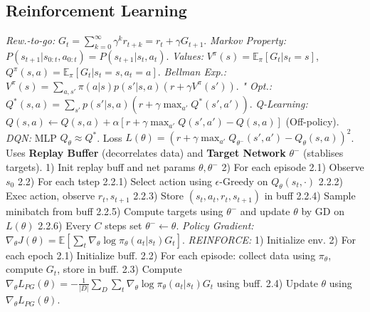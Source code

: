 \subsection{Reinforcement Learning}
\emph{Rew.-to-go:} $G_t =\sum_{k=0}^\infty \gamma^k r_{t+k} = r_t + \gamma G_{t+1}$.
\emph{Markov Property:} $P(s_{t+1}|s_{0:t}, a_{0:t}) = P(s_{t+1}|s_t, a_t)$.
\emph{Values:} $V^\pi(s) = \mathbb{E}_\pi[G_t | s_t = s]$, $Q^\pi(s, a) = \mathbb{E}_\pi[G_t | s_t = s, a_t = a]$.
\emph{Bellman Exp.:} $V^\pi(s) = \sum_{a,s'} \pi(a|s) p(s'|s, a) (r + \gamma V^\pi(s'))$.
\emph{" Opt.:} $Q^*(s, a) = \sum_{s'} p(s'|s, a) (r + \gamma \max_{a'} Q^*(s', a'))$.
\emph{Q-Learning:} $Q(s, a) \leftarrow Q(s, a) + \alpha [r + \gamma \max_{a'} Q(s', a') - Q(s, a)]$ (Off-policy). 
\emph{DQN:} MLP $Q_\theta \approx Q^*$. Loss $L(\theta) = (r + \gamma \max_{a'} Q_{\theta^-}(s', a') - Q_\theta(s, a))^2$. Uses \textbf{Replay Buffer} (decorrelates data) and \textbf{Target Network} $\theta^-$ (stablises targets). 1) Init replay buff and net params $\theta, \theta^-$ 2) For each episode 2.1) Observe $s_0$  2.2) For each tstep 2.2.1) Select action using $\epsilon$-Greedy on $Q_\theta(s_t, \cdot)$ 2.2.2) Exec action, observe $r_t,s_{t+1}$ 2.2.3) Store $(s_t, a_t, r_t, s_{t+1})$ in buff 2.2.4) Sample minibatch from buff 2.2.5) Compute targets using $\theta^-$ and update $\theta$ by GD on $L(\theta)$ 2.2.6) Every $C$ steps set $\theta^- \leftarrow \theta$.
\emph{Policy Gradient:} $\nabla_\theta J(\theta) = \mathbb{E} [ \sum_t \nabla_\theta \log \pi_\theta(a_t|s_t) G_t ]$. 
\emph{REINFORCE:} 1) Initialize env. 2) For each epoch 2.1) Initialize buff. 2.2) For each episode: collect data using $\pi_\theta$, compute $G_t$, store in buff. 2.3) Compute $\nabla_\theta L_{PG}(\theta) = -\frac{1}{|D|} \sum_{D} \sum_t \nabla_\theta\log \pi_\theta(a_t|s_t) G_t$ using buff. 2.4) Update $\theta$ using $\nabla_\theta L_{PG}(\theta)$.

